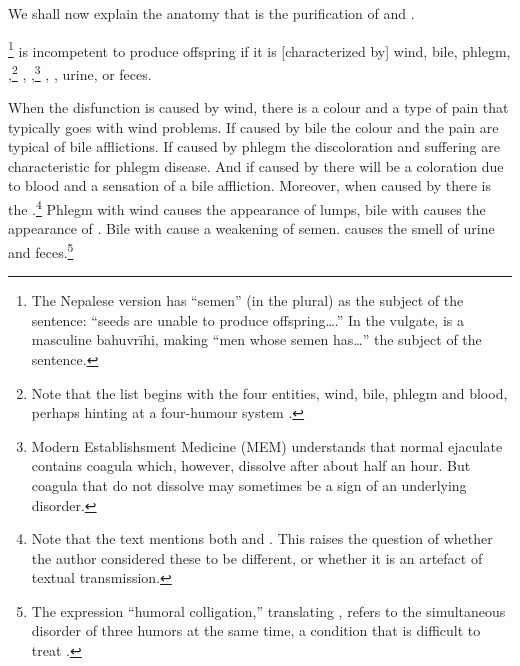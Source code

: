 \begin{translation}
    
    \item [1] We shall now explain the anatomy that is the purification of 
     and 
    .
%    
    
    \item [3]  \footnote{The Nepalese version has
     “semen” (in the plural) as the subject of the sentence: “seeds 
    are
    unable to produce offspring\ldots.”  In the vulgate, 
    is a masculine bahuvrīhi, making “men whose semen has\ldots” the
    subject of the sentence.} is incompetent to produce offspring if it
    is [characterized by] wind, bile, phlegm,
    ,\footnote{Note that the list begins with the
        four entities, wind, bile, phlegm and blood, perhaps hinting at a
        four-humour system \citep[see][485--486]{wuja-2000}.}
        ,
        ,\footnote{Modern Establishsment Medicine (MEM) 
        understands
            that normal ejaculate contains coagula which, however, dissolve after
            about half an hour.  But coagula that do not dissolve may sometimes
            be a sign of an underlying disorder.} , , urine, or feces.
    
 

 \item[4]
 
  When the disfunction is caused by wind, there is a colour and a type of
pain
  that typically goes with wind problems. If  caused by bile the colour and the 
  pain are typical of bile afflictions.  If caused by phlegm the discoloration and 
  suffering are characteristic for phlegm disease.  And if caused by  
   there will be a coloration due to blood and a 
  sensation of a bile affliction. Moreover, when caused by 
   there is the .\footnote{Note that the text mentions both  and 
  .  This raises the question of whether the author considered these 
  to be different, or whether it is an artefact of textual transmission.}  Phlegm 
  with wind causes the appearance of lumps,
  bile with   causes the appearance of 
  . 
   Bile with  cause a weakening of semen.
       causes the smell of urine and 
      feces.\footnote{The expression “humoral colligation,” translating 
      , refers to the simultaneous 
      disorder of three humors at the same time, a condition that is difficult to 
      treat \citep[see][38 \emph{et 
      passim}]{wuja-2016}.}
      

\end{translation}
